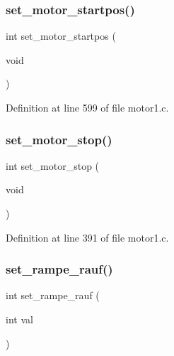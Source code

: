 \mbox{\label{_motor1_8h_a01a9f2f0272b5b4f53e9b5d8487328a5}} 
\subsubsection{set\+\_\+motor\+\_\+startpos()}
{\footnotesize\ttfamily int set\+\_\+motor\+\_\+startpos (\begin{DoxyParamCaption}\item[{void}]{ }\end{DoxyParamCaption})}



Definition at line 599 of file motor1.\+c.

\mbox{\label{_motor1_8h_afd8be57a5ca0755c4b210876e2dcc671}} 
\subsubsection{set\+\_\+motor\+\_\+stop()}
{\footnotesize\ttfamily int set\+\_\+motor\+\_\+stop (\begin{DoxyParamCaption}\item[{void}]{ }\end{DoxyParamCaption})}



Definition at line 391 of file motor1.\+c.

\mbox{\label{_motor1_8h_aad5f46d79361d110c090c1ac06fe7cf0}} 
\subsubsection{set\+\_\+rampe\+\_\+rauf()}
{\footnotesize\ttfamily int set\+\_\+rampe\+\_\+rauf (\begin{DoxyParamCaption}\item[{int}]{val }\end{DoxyParamCaption})}

\mbox{\label{_motor1_8h_a94087d0106b87035292685bb075c458b}} 
